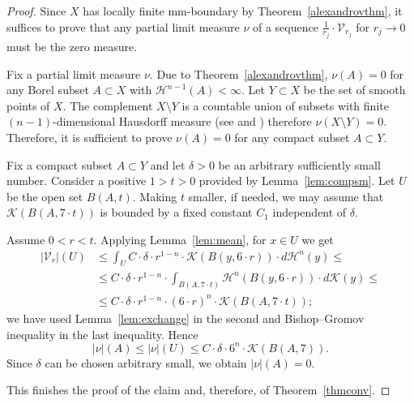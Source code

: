 \documentclass[12pt,leqno,intlimits]{amsart}
\numberwithin{equation}{section}
\theoremstyle{definition}
\theoremstyle{remark}
\newcommand{\tref}[1]{Theorem~\ref{#1}}
\newcommand{\lref}[1]{Lemma~\ref{#1}}
\begin{document}
\begin{proof}
Since $X$ has locally finite mm-boundary by
\tref{alexandrovthm}, it suffices to prove that any partial limit measure $\nu$ of a sequence $\frac 1 {r_j}\cdot \mathcal{V}_{r_j}$ for $r_j\to 0$ must be the zero measure.

Fix a partial limit measure $\nu$.
Due to \tref{alexandrovthm}, $\nu (A)=0$ for any Borel subset $A\subset X$ with $\mathcal H^{n-1} (A)<\infty$.
Let $Y\subset X$ be the set of smooth points of $X$.
The complement $X\setminus Y$ is a countable union of subsets with finite $(n-1)$-dimensional Hausdorff measure (see \cite{zajicek} and \cite[Theorem 1.4]{Schneider}) therefore $\nu (X\setminus Y) =0$. Therefore, it is sufficient to prove $\nu (A)=0$
for any compact subset $A\subset Y$.

Fix a compact subset $A\subset Y$ and let $\delta>0$ be an arbitrary sufficiently small number. Consider a positive $1>t>0$ provided by \lref{lem:compsm}. Let $U$ be the open set $B (A,t)$.
Making $t$ smaller, if needed, we may assume that $\mathcal K(B(A,{7{\cdot}t}))$ is bounded by a
fixed constant $C_1$ independent of $\delta$.

Assume $0<r<t$.
Applying \lref{lem:mean}, for $x\in U$ we get
\begin{align*}
|\mathcal{V}_r| (U)
&\leq \int _U C\cdot \delta \cdot r^{1-n}\cdot \mathcal K (B (y,{6{\cdot}r})) \cdot d\mathcal H^n (y) \leq
\\
&\leq C\cdot \delta \cdot r^{1-n} \cdot \int _{B (A,{7{\cdot}t})} \mathcal H^n (B (y,{6{\cdot}r})) \cdot d\mathcal K(y)
\leq
\\
&\leq C\cdot \delta \cdot r^{1-n} \cdot (6{\cdot}r) ^n \cdot \mathcal K(B (A,{7{\cdot}t}));
\end{align*}
we have used \lref{lem:exchange} in the second and Bishop--Gromov inequality in the last inequality. Hence
$$|\nu| (A) \leq |\nu| (U) \leq C\cdot \delta \cdot 6^n \cdot \mathcal K(B (A,7)). $$
Since $\delta$ can be chosen arbitrary small, we obtain $|\nu| (A)=0$.

This finishes the proof of the claim and, therefore, of \tref{thmconv}.
\end{proof}

\end{document}
